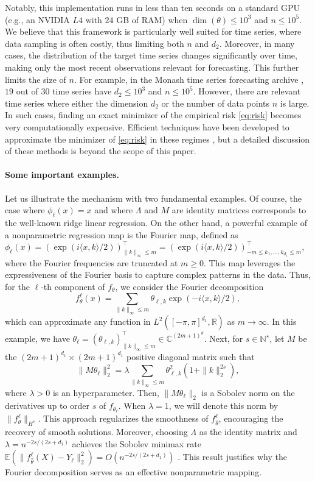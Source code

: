 Notably, this implementation runs in less than ten seconds on a standard GPU (e.g., an NVIDIA $L4$ with $24$ GB of RAM) when $\dim(\theta) \leq 10^3$ and $n \leq 10^5$. 
We believe that this framework is particularly well suited for time series, where data sampling is often costly, thus limiting both $n$ and $d_2$. Moreover, in many cases, the distribution of the target time series changes significantly over time, making only the most recent observations relevant for forecasting. This further limits the size of $n$. For example, in the Monash time series forecasting archive \citep{Godahewa2021Monash}, $19$ out of $30$ time series have $d_2 \leq 10^3$ and $n \leq 10^5$. 
However, there are relevant time series where either the dimension $d_2$ or the number of data points $n$ is large. 
In such cases, finding an exact minimizer of the empirical risk \eqref{eq:risk} becomes very computationally expensive. 
Efficient techniques have been developed to approximate the minimizer of \eqref{eq:risk} in these regimes \citep[see, e.g.,][]{meanti2020kernel}, but a detailed discussion of these methods is beyond the scope of this paper.

\paragraph{Some important examples.}
Let us illustrate the mechanism with two fundamental examples. Of course, the case where $\phi_\ell(x) = x$ and where $\Lambda$ and $M$ are identity matrices corresponds to the well-known ridge linear regression. 
On the other hand, a powerful example of a nonparametric regression map is the Fourier map, defined as $\phi_\ell(x) = (\exp(i \langle x, k \rangle / 2))_{\|k\|_\infty \leq m}^\top = (\exp(i \langle x, k \rangle / 2))_{-m\leq k_1, \hdots, k_{d_1} \leq m}^\top$, where the Fourier frequencies are truncated at $m \geq 0$. 
This map leverages the expressiveness of the Fourier basis to capture complex patterns in the data. Thus, for the $\ell$-th component of $f_{\theta}$, we consider the Fourier decomposition
\[
f^\ell_{ \theta}(x) =  \sum_{\|k\|_\infty \leq m}  \theta_{\ell,k} \exp(-i \langle x, k\rangle/2),
\]
which can approximate any function in $L^2([-\pi, \pi]^{d_1}, \mathbb{R})$ as $m \to \infty$. In this example, we have $\theta_{\ell}=(\theta_{\ell,k})_{\|k\|_\infty \leq m}^\top \in \mathbb C^{(2m+1)^d}$. 
Next, for $s \in \mathbb N^\star$, 
let $M$ be the $(2m+1)^{d_1}\times (2m+1)^{d_1}$ positive diagonal matrix such that
\[
\|M \theta_\ell\|_2^2  = \lambda \sum_{\|k\|_{\infty} \leq m} \theta_{\ell,k}^2 (1+\|k\|_2^{2s}),
\]
where $\lambda > 0$ is an hyperparameter.
Then, $\|M \theta_\ell\|_2$
is a Sobolev norm on the derivatives up to order $s$ of $f_{\theta_\ell}$.
When $\lambda = 1$, we will denote this norm by $\|f_{\theta}^\ell\|_{H^s}$. 
This approach regularizes the smoothness of $f_{\hat{\theta}}^{\ell}$, encouraging the recovery of smooth solutions. 
Moreover, choosing $\Lambda$ as the identity matrix and $\lambda = n^{-2s/(2s+d_1)}$ achieves the Sobolev minimax rate $\mathbb E(\|f_{\hat \theta}^\ell(X) -Y_\ell\|_2^2) = O(n^{-2s/(2s+d_1)})$ \citep{blanchard2020kernel}. 
This result justifies why the Fourier decomposition serves as an effective nonparametric mapping. 

